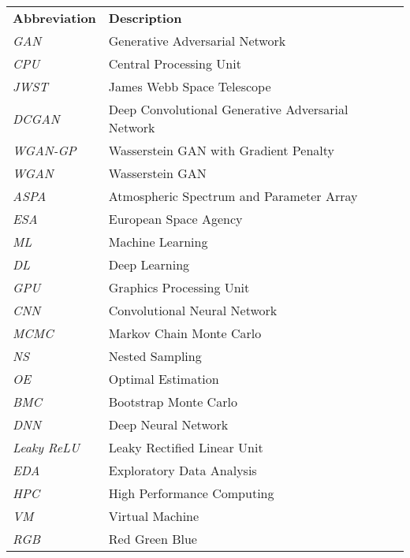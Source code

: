 \begin{table}[]
\begin{tabular}{ll}
\textbf{Abbreviation} & \textbf{Description}                              \\
\textit{GAN}          & Generative Adversarial Network                    \\
\textit{CPU}          & Central Processing Unit                           \\
\textit{JWST}         & James Webb Space Telescope                        \\
\textit{DCGAN}        & Deep Convolutional Generative Adversarial Network \\
\textit{WGAN-GP}      & Wasserstein GAN with Gradient Penalty              \\
\textit{WGAN}         & Wasserstein GAN                                   \\
\textit{ASPA}         & Atmospheric Spectrum and Parameter Array          \\
\textit{ESA}          & European Space Agency                             \\
\textit{ML}           & Machine Learning                                  \\
\textit{DL}           & Deep Learning                                     \\
\textit{GPU}          & Graphics Processing Unit                          \\
\textit{CNN}          & Convolutional Neural Network                      \\
\textit{MCMC}         & Markov Chain Monte Carlo                          \\
\textit{NS}           & Nested Sampling                                   \\
\textit{OE}           & Optimal Estimation                                \\
\textit{BMC}          & Bootstrap Monte Carlo                             \\
\textit{DNN}          & Deep Neural Network                               \\
\textit{Leaky ReLU}   & Leaky Rectified Linear Unit                       \\
\textit{EDA}          & Exploratory Data Analysis                         \\
\textit{HPC}          & High Performance Computing                        \\
\textit{VM}           & Virtual Machine                                  \\
\textit{RGB}          & Red Green Blue                        
\end{tabular}
\end{table}